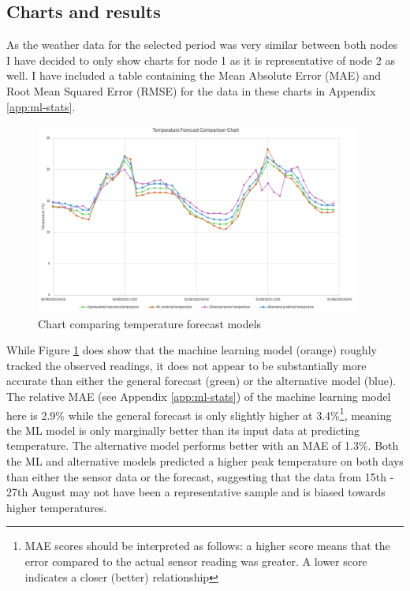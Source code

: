 \subsection{Charts and results}

As the weather data for the selected period was very similar between both nodes
I have decided to only show charts for node 1 as it is representative of node 2
as well. I have included a table containing the Mean Absolute Error (MAE) and
Root Mean Squared Error (RMSE) for the data in these charts in Appendix
\ref{app:ml-stats}.

\begin{figure}[H]
    \centering
    \includegraphics[width=0.95\textwidth]{contents/part-4/fig4/temperature-graph.png}
    \caption{Chart comparing temperature forecast models}
    \label{fig:temperature-chart}
\end{figure}

While Figure \ref{fig:temperature-chart} does show that the machine learning
model (orange) roughly tracked the observed readings, it does not appear to be
substantially more accurate than either the general forecast (green) or the
alternative model (blue). The relative MAE (see Appendix \ref{app:ml-stats}) of
the machine learning model here is 2.9\% while the general forecast is only
slightly higher at 3.4\%\footnote{MAE scores should be interpreted as follows: a
higher score means that the error compared to the actual sensor reading was
greater. A lower score indicates a closer (better) relationship}, meaning the ML
model is only marginally better than its input data at predicting temperature.
The alternative model performs better with an MAE of 1.3\%. Both the ML and
alternative models predicted a higher peak temperature on both days than either
the sensor data or the forecast, suggesting that the data from 15th - 27th
August may not have been a representative sample and is biased towards higher
temperatures.

